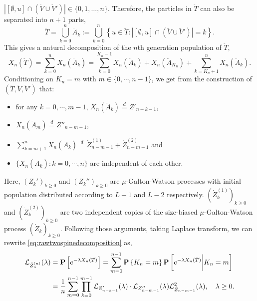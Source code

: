 \documentclass[12pt]{amsart}
\theoremstyle{remark}
\numberwithin{equation}{section}
\newcommand{\prob}{\mathbf P}
\newcommand{\norm}[1]{\left\| #1 \right\|}
\newcommand{\expr}[1]{\left( #1 \right)}
\newcommand{\brac}[1]{\left[ #1 \right]}
\newcommand{\set}[1]{\left\{ #1 \right\}}
\newcommand{\ancestor}[1]{[\emptyset,#1]}
\newcommand{\eqlaw}{\overset{d}{=}}
\begin{document}
$|\ancestor{u}\cap(\ddot V\cup \ddot V')|\in\{0,1,\dots,n\}$. 
Therefore, the particles in $\ddot T$ can also be separated into $n+1$ parts,
\begin{equation*}
		\ddot T
	=
		\bigcup_{k=0}^n \ddot A_k
	:=
		\bigcup_{k=0}^n\set{u\in\ddot T:
		|\ancestor{u}\cap\expr{\ddot V\cup\ddot V'}|=k}.
\end{equation*}
This gives a natural decomposition of the $n$th generation population of $\ddot T$,
\begin{equation}
\label{eq:rawtwospinedecomposition}
		X_n(\ddot T)
	=
		\sum_{k=0}^nX_n(\ddot A_k)
	=
	    \sum_{k=0}^{K_n-1}X_n(\ddot A_k)
	+
		X_n(\ddot A_{K_n})
	+
		\sum_{k=K_n+1}^nX_n(\ddot A_k).
\end{equation}
Conditioning on $K_n=m$ with $m\in\{0,\cdots,n-1\}$, we get from the construction of $(\ddot T,\ddot V,\ddot V')$ that:
\begin{itemize}
\item
    for any $k=0,\cdots,m-1$, $X_n(\ddot A_k)\eqlaw Z'_{n-k-1}$,
\item
    $X_n(\ddot A_m)\eqlaw Z''_{n-m-1}$,
\item
    $\sum_{k=m+1}^nX_n(\ddot A_k)\eqlaw \dot Z_{n-m-1}^{(1)}+\dot Z_{n-m-1}^{(2)}$ and
\item
    $\{X_n(\ddot A_k):k=0,\cdots,n\}$ are independent of each other.
\end{itemize}
Here, $(Z_k')_{k\ge 0}$ and $(Z_k'')_{k\ge 0}$ are $\mu$-Galton-Watson
processes with initial population distributed according to $\dot L-1$ and 
$\ddot L-2$ respectively. $(\dot Z_k^{(1)})_{k\ge 0}$ and 
$(\dot Z_k^{(2)})_{k\ge 0}$ are two independent copies of the size-biased 
$\mu$-Galton-Watson process $(\dot Z_k)_{k\ge 0}$. 
Following those arguments, taking Laplace transform, 
we can rewrite \eqref{eq:rawtwospinedecomposition} as,
\begin{equation}
\label{eq:laplacetransformationoftwospinedecomposition}
\begin{split}
		\cL_{\ddot Z_n^{(n)}}(\lambda)
	&=
		\prob\brac{e^{-\lambda X_n(\ddot T)}}
	=
	    \sum_{m=0}^{n-1}\prob\set{K_n=m}\prob\brac{e^{-\lambda X_n(\ddot T)}\bigg| K_n=m}
	\\&=
        \frac{1}{n}\sum_{m=0}^{n-1}\prod_{k=0}^{m-1}\cL_{Z'_{n-k-1}}(\lambda)
    \cdot
        \cL_{Z''_{n-m-1}}(\lambda)\cL_{\dot Z_{n-m-1}}^2(\lambda)
    ,\quad\lambda\geq 0.
\end{split}
\end{equation}
\end{document}
